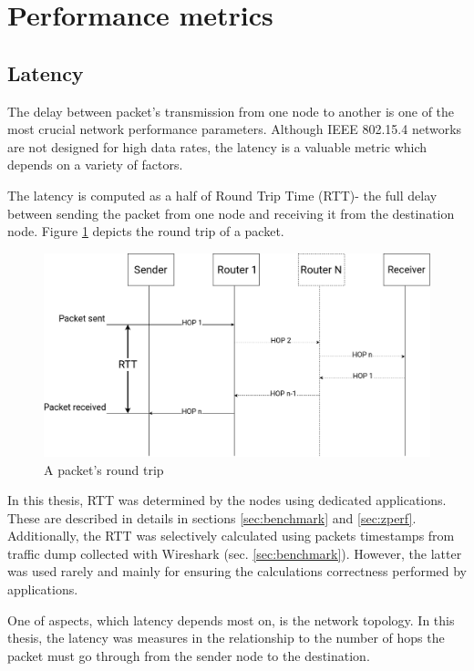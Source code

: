 

\section{Performance metrics}
\label{sec:performance-metrics}
\subsection*{Latency}

The delay between packet's transmission from one node to another is one of the 
most crucial network performance parameters. Although IEEE 802.15.4 networks are not
designed for high data rates, the latency is a valuable metric which depends on a variety of 
factors.

The latency is computed as a half of Round Trip Time (RTT)- the full delay between sending the packet from one node and receiving it from the destination node. Figure \ref{fig:round_trip}  depicts the round trip of a packet.
\vspace{2em}

\begin{figure} [H]
    \centering
    \includegraphics[scale=0.3]{images/rtt-diagram.png}
    \caption{A packet's round trip}
    \label{fig:round_trip}
\end{figure}

In this thesis, RTT was determined by the nodes using dedicated applications. These are described in 
details in sections \ref{sec:benchmark} and \ref{sec:zperf}. Additionally, the RTT was selectively 
calculated using packets timestamps from traffic dump collected with Wireshark (sec. 
\ref{sec:benchmark}). However, the latter was used rarely and mainly for ensuring the
calculations correctness performed by applications.

One of aspects, which latency depends most on, is the network topology. In this thesis,
the latency was measures in the relationship to the number of hops the packet must go through 
from the sender node to the destination.

